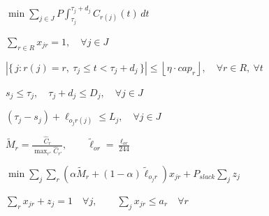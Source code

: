 %
%
%
%



$\min \sum_{j \in J} P \int_{\tau_j}^{\tau_j + d_j} C_{r(j)}(t)\, dt$

$\sum_{r \in R} x_{jr} = 1, \quad \forall j \in J$

$\left| \{\, j : r(j) = r,\ \tau_j \le t < \tau_j + d_j \,\} \right| \le \left\lfloor \eta \cdot cap_r \right\rfloor, \quad \forall r \in R,\ \forall t$

$s_j \le \tau_j, \quad \tau_j + d_j \le D_j, \quad \forall j \in J$

$(\tau_j - s_j) + \ell_{o_j r(j)} \le L_j, \quad \forall j \in J$

$\tilde{M}_r = \frac{\hat{C}_r}{\max_{r'} \hat{C}_{r'}}, \qquad \tilde{\ell}_{or} = \frac{\ell_{or}}{244}$

$\min \sum_{j} \sum_{r} \left( \alpha \tilde{M}_r + (1 - \alpha) \tilde{\ell}_{o_j r} \right) x_{jr} + P_{slack} \sum_{j} z_j$

$\sum_{r} x_{jr} + z_j = 1 \quad \forall j, \qquad \sum_{j} x_{jr} \le a_r \quad \forall r$

